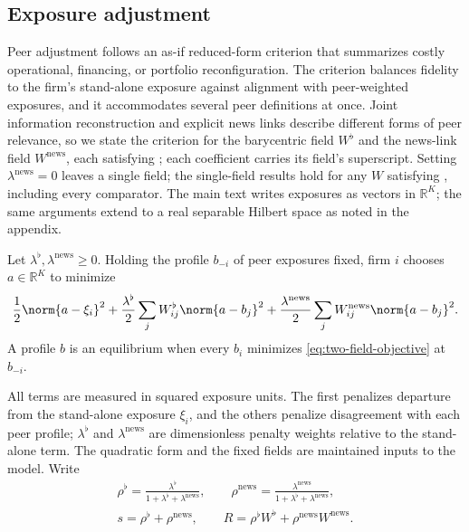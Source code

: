 \subsection{Exposure adjustment}\label{sec:exposure-adjustment}

Peer adjustment follows an as-if reduced-form criterion that summarizes costly
operational, financing, or portfolio reconfiguration.
The criterion balances fidelity to the firm's stand-alone exposure against
alignment with peer-weighted exposures, and it accommodates several peer
definitions at once.
Joint information reconstruction and explicit news links describe different
forms of peer relevance, so we state the criterion for the barycentric field
$W^\flat$ and the news-link field $W^{\mathrm{news}}$, each satisfying
; each coefficient carries its field's
superscript.
Setting $\lambda^{\mathrm{news}}=0$ leaves a single field; the single-field
results hold for
any $W$ satisfying , including every comparator.
The main text writes exposures as vectors in $\mathbb R^K$; the same arguments
extend to a real separable Hilbert space as noted in the appendix.

\begin{definition}\label{def:adjustment-problem}
  \label{def:two-field-adjustment}
  Let $\lambda^\flat,\lambda^{\mathrm{news}}\geq0$.
  Holding the profile $b_{-i}$ of peer exposures fixed, firm $i$ chooses
  $a\in\mathbb R^K$ to minimize
  \begin{equation}\label{eq:two-field-objective}
    \frac{1}{2}\norm{a-\xi_i}^2
    +\frac{\lambda^\flat}{2}\sum_j W^\flat_{ij}\norm{a-b_j}^2
    +\frac{\lambda^{\mathrm{news}}}{2}\sum_j W^{\mathrm{news}}_{ij}\norm{a-b_j}^2 .
  \end{equation}
  A profile $b$ is an equilibrium when every $b_i$ minimizes
  \eqref{eq:two-field-objective} at $b_{-i}$.
\end{definition}

All terms are measured in squared exposure units.
The first penalizes departure from the stand-alone exposure $\xi_i$, and the
others penalize disagreement with each peer profile; $\lambda^\flat$ and
$\lambda^{\mathrm{news}}$
are dimensionless penalty weights relative to the stand-alone term.
The quadratic form and the fixed fields are maintained inputs to the model.
Write
\[
  \begin{gathered}
    \rho^\flat=\frac{\lambda^\flat}{1+\lambda^\flat+\lambda^{\mathrm{news}}},
    \qquad
    \rho^{\mathrm{news}}
    =\frac{\lambda^{\mathrm{news}}}{1+\lambda^\flat+\lambda^{\mathrm{news}}},
    \\
    s=\rho^\flat+\rho^{\mathrm{news}},
    \qquad
    R=\rho^\flat W^\flat+\rho^{\mathrm{news}} W^{\mathrm{news}}.
  \end{gathered}
\]

